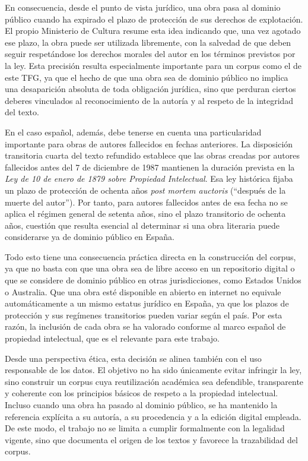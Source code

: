 \documentclass[IB]{TFUOC}%
\begin{document}
En consecuencia, desde el punto de vista jurídico, una obra pasa al dominio público cuando ha expirado el plazo de protección de sus derechos de explotación. El propio Ministerio de Cultura resume esta idea indicando que, una vez agotado ese plazo, la obra puede ser utilizada libremente, con la salvedad de que deben seguir respetándose los derechos morales del autor en los términos previstos por la ley. Esta precisión resulta especialmente importante para un corpus como el de este TFG, ya que el hecho de que una obra sea de dominio público no implica una desaparición absoluta de toda obligación jurídica, sino que perduran ciertos deberes vinculados al reconocimiento de la autoría y al respeto de la integridad del texto.

En el caso español, además, debe tenerse en cuenta una particularidad importante para obras de autores fallecidos en fechas anteriores. La disposición transitoria cuarta del texto refundido establece que las obras creadas por autores fallecidos antes del 7 de diciembre de 1987 mantienen la duración prevista en la \textit{Ley de 10 de enero de 1879 sobre Propiedad Intelectual}\cite{lpi_1_1879}. Esa ley histórica fijaba un plazo de protección de ochenta años \textit{post mortem auctoris} (“después de la muerte del autor”). Por tanto, para autores fallecidos antes de esa fecha no se aplica el régimen general de setenta años, sino el plazo transitorio de ochenta años, cuestión que resulta esencial al determinar si una obra literaria puede considerarse ya de dominio público en España.

Todo esto tiene una consecuencia práctica directa en la construcción del corpus, ya que no basta con que una obra sea de libre acceso en un repositorio digital o que se considere de dominio público en otras jurisdicciones, como Estados Unidos o Australia. Que una obra esté disponible en abierto en internet no equivale automáticamente a un mismo estatus jurídico en España, ya que los plazos de protección y sus regímenes transitorios pueden variar según el país. Por esta razón, la inclusión de cada obra se ha valorado conforme al marco español de propiedad intelectual, que es el relevante para este trabajo.

Desde una perspectiva ética, esta decisión se alinea también con el uso responsable de los datos. El objetivo no ha sido únicamente evitar infringir la ley, sino construir un corpus cuya reutilización académica sea defendible, transparente y coherente con los principios básicos de respeto a la propiedad intelectual. Incluso cuando una obra ha pasado al dominio público, se ha mantenido la referencia explícita a su autoría, a su procedencia y a la edición digital empleada. De este modo, el trabajo no se limita a cumplir formalmente con la legalidad vigente, sino que documenta el origen de los textos y favorece la trazabilidad del corpus.
\end{document}
